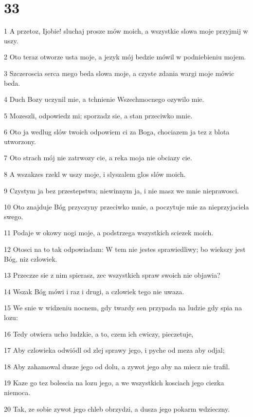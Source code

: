 \chapter{33}

\par 1 A przetoz, Ijobie! sluchaj prosze mów moich, a wszystkie slowa moje przyjmij w uszy.
\par 2 Oto teraz otworze usta moje, a jezyk mój bedzie mówil w podniebieniu mojem.
\par 3 Szczeroscia serca mego beda slowa moje, a czyste zdania wargi moje mówic beda.
\par 4 Duch Bozy uczynil mie, a tchnienie Wszechmocnego ozywilo mie.
\par 5 Mozeszli, odpowiedz mi; sporzadz sie, a stan przeciwko mnie.
\par 6 Oto ja wedlug slów twoich odpowiem ci za Boga, chociazem ja tez z blota utworzony.
\par 7 Oto strach mój nie zatrwozy cie, a reka moja nie obciazy cie.
\par 8 A wszakzes rzekl w uszy moje, i slyszalem glos slów moich.
\par 9 Czystym ja bez przestepstwa; niewinnym ja, i nie masz we mnie nieprawosci.
\par 10 Oto znajduje Bóg przyczyny przeciwko mnie, a poczytuje mie za nieprzyjaciela swego.
\par 11 Podaje w okowy nogi moje, a podstrzega wszystkich sciezek moich.
\par 12 Otosci na to tak odpowiadam: W tem nie jestes sprawiedliwy; bo wiekszy jest Bóg, niz czlowiek.
\par 13 Przeczze sie z nim spierasz, zec wszystkich spraw swoich nie objawia?
\par 14 Wszak Bóg mówi i raz i drugi, a czlowiek tego nie uwaza.
\par 15 We snie w widzeniu nocnem, gdy twardy sen przypada na ludzie gdy spia na lozu:
\par 16 Tedy otwiera ucho ludzkie, a to, czem ich cwiczy, pieczetuje,
\par 17 Aby czlowieka odwiódl od zlej sprawy jego, i pyche od meza aby odjal;
\par 18 Aby zahamowal dusze jego od dolu, a zywot jego aby na miecz nie trafil.
\par 19 Kaze go tez bolescia na lozu jego, a we wszystkich kosciach jego ciezka niemoca.
\par 20 Tak, ze sobie zywot jego chleb obrzydzi, a dusza jego pokarm wdzieczny.
